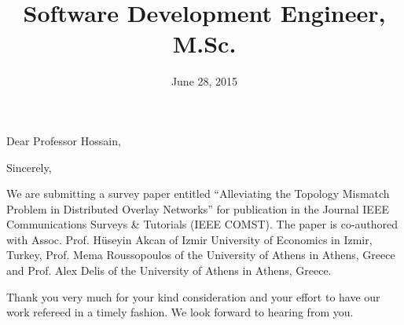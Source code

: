 \documentclass[12pt,a4paper,sans]{moderncv}        %
\title{Software Development Engineer, M.Sc.}                               %
\begin{document}
\date{June 28, 2015}
\opening{Dear Professor Hossain,}
\closing{Sincerely,}
\makelettertitle

We are submitting a survey paper entitled ``Alleviating the Topology Mismatch Problem in Distributed Overlay Networks'' for publication in the Journal IEEE Communications Surveys \& Tutorials (IEEE COMST). The paper is co-authored with Assoc. Prof. H\"useyin Akcan of Izmir University of Economics in Izmir, Turkey, Prof. Mema Roussopoulos of the University of Athens in Athens, Greece and Prof. Alex Delis of the University of Athens in Athens, Greece.

Thank you very much for your kind consideration and your effort to have our work refereed in a timely fashion. We look forward to hearing from you.

\makeletterclosing
\end{document}
